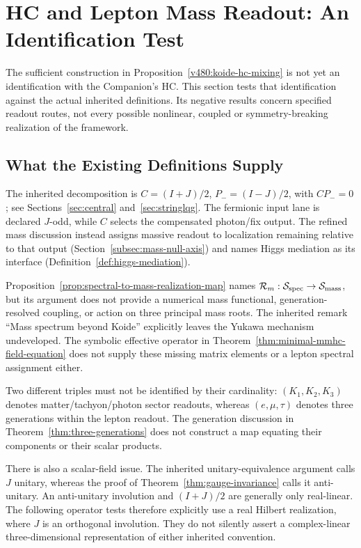 \section{HC and Lepton Mass Readout: An Identification Test}
\label{v480:hc-mass-identification}

The sufficient construction in Proposition~\ref{v480:koide-hc-mixing}
is not yet an identification with the Companion's HC. This section tests
that identification against the actual inherited definitions. Its
negative results concern specified readout routes, not every possible
nonlinear, coupled or symmetry-breaking realization of the framework.

\subsection{What the Existing Definitions Supply}
\label{v480:hc-mass-source-map}

The inherited decomposition is $C=(I+J)/2$, $P_-=(I-J)/2$, with
$CP_-=0$; see Sections~\ref{sec:central} and~\ref{sec:stringlqg}.
The fermionic input lane is declared $J$-odd, while $C$ selects the
compensated photon/fix output. The refined mass discussion instead
assigns massive readout to localization remaining relative to that
output (Section~\ref{subsec:mass-null-axis}) and names Higgs mediation
as its interface (Definition~\ref{def:higgs-mediation}).

Proposition~\ref{prop:spectral-to-mass-realization-map} names
$\mathcal R_m:\mathcal S_{\rm spec}\to\mathcal S_{\rm mass}$,
but its argument does not provide a numerical mass functional,
generation-resolved coupling, or action on three principal mass roots.
The inherited remark ``Mass spectrum beyond Koide'' explicitly leaves
the Yukawa mechanism undeveloped. The symbolic effective operator in
Theorem~\ref{thm:minimal-mmhc-field-equation} does not supply these
missing matrix elements or a lepton spectral assignment either.

Two different triples must not be identified by their cardinality:
$(K_1,K_2,K_3)$ denotes matter/tachyon/photon sector readouts,
whereas $(e,\mu,\tau)$ denotes three generations within the lepton
readout. The generation discussion in Theorem~\ref{thm:three-generations} does not
construct a map equating their components or their scalar products.

There is also a scalar-field issue. The inherited unitary-equivalence
argument calls $J$ unitary, whereas the proof of
Theorem~\ref{thm:gauge-invariance} calls it anti-unitary. An
anti-unitary involution and $(I+J)/2$ are generally only real-linear.
The following operator tests therefore explicitly use a real Hilbert
realization, where $J$ is an orthogonal involution. They do not silently
assert a complex-linear three-dimensional representation of either
inherited convention.

